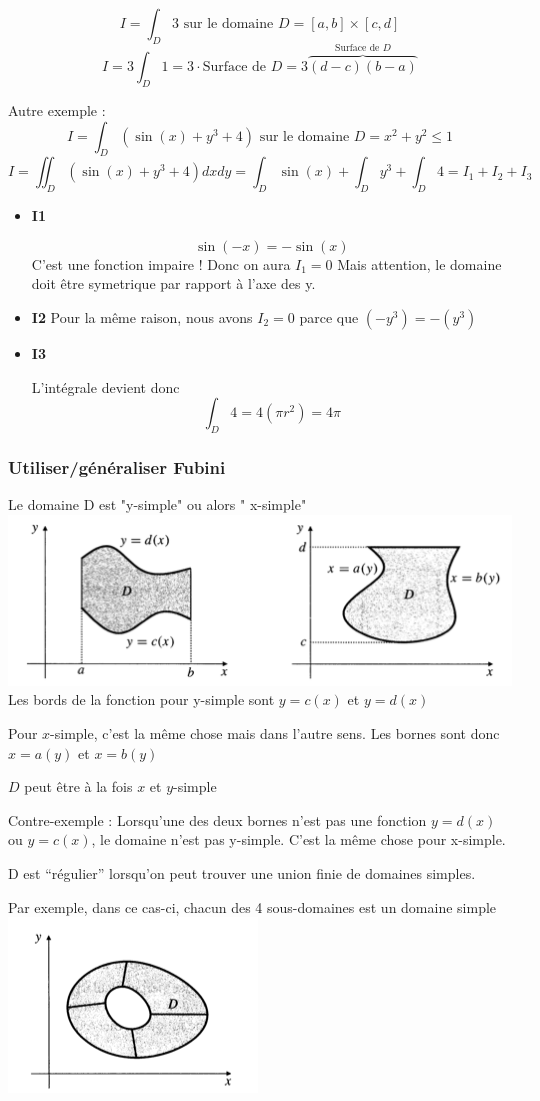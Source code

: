 \[I=\int_D 3 \text{ sur le domaine } D=[a,b]\times[c,d]\]
\[I=3\int_D 1 = 3 \cdot \text{Surface de }D = 3\overbrace{(d-c)(b-a)}^{\text{Surface de }D} \]

Autre exemple :
\[I = \int_D ( \sin(x) +y^3 + 4 )\text{ sur le domaine } D=x^2+y^2\le 1\]
\[I = \iint_D(\sin(x)+y^3+4)dxdy = \int_D \sin(x) + \int_D y^3 + \int_D 4 = I_1 + I_2 + I_3\]
\begin{itemize}

\item \textbf{I1}




\[\sin(-x) = -\sin(x) \]
C'est une fonction impaire !
Donc on aura \emph{$I_1=0$}
Mais attention, le domaine doit être symetrique par rapport à l'axe des y.
\item \textbf{I2}
Pour la même raison, nous avons $I_2=0$ parce que $(-y^3) = -(y^3)$

\item \textbf{I3}

L'intégrale devient donc
\[\int_D 4 = 4(\pi r^2) = 4\pi \]

\end{itemize}
\subsubsection{Utiliser/généraliser Fubini}

Le domaine D est "y-simple" ou alors " x-simple"\\
\includegraphics[scale=0.7]{image2.png}
\\
Les bords de la fonction pour y-simple sont $y=c(x)$ et $y=d(x)$

Pour $x$-simple, c'est la même chose mais dans l'autre sens. Les bornes sont donc $x=a(y)$ et $x=b(y)$
\begin{myrem}
$D$ peut être à la fois $x$ et $y$-simple
\end{myrem}
\begin{myrem}
Contre-exemple : Lorsqu'une des deux bornes n'est pas une fonction $y=d(x)$ ou $y=c(x)$, le domaine n'est pas y-simple. C'est la même chose pour x-simple.

\end{myrem}

\begin{myrem}
D est ``régulier'' lorsqu'on peut trouver une union finie de domaines simples.


Par exemple, dans ce cas-ci, chacun des 4 sous-domaines est un domaine simple\\
\includegraphics[scale=1]{image1.png}

\end{myrem}
